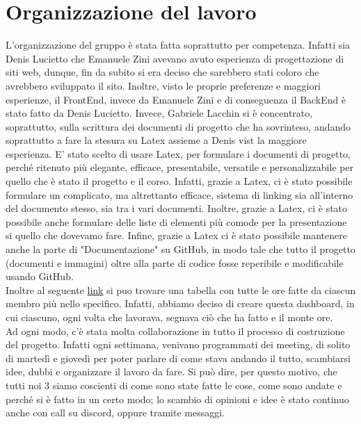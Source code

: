 \documentclass{article}
\begin{document}

\pagebreak

\tableofcontents
\pagebreak

\section{Organizzazione del lavoro}

L'organizzazione del gruppo è stata fatta soprattutto per competenza. Infatti sia Denis Lucietto che Emanuele Zini avevano avuto esperienza di progettazione di siti web, dunque, fin da subito si era deciso che sarebbero stati coloro che avrebbero sviluppato il sito. Inoltre, visto le proprie preferenze e maggiori esperienze, il FrontEnd, invece da Emanuele Zini e di conseguenza il BackEnd è stato fatto da Denis Lucietto. Invece, Gabriele Lacchin si è concentrato, soprattutto, sulla scrittura dei documenti di progetto che ha sovrinteso, andando soprattutto a fare la stesura su Latex assieme a Denis vist la maggiore esperienza. E' stato scelto di usare Latex, per formulare i documenti di progetto, perché ritenuto più elegante, efficace, presentabile, versatile e personalizzabile per quello che è stato il progetto e il corso. Infatti, grazie a Latex, ci è stato possibile formulare un complicato, ma altrettanto efficace, sistema di linking sia all'interno del documento stesso, sia tra i vari documenti. Inoltre, grazie a Latex, ci è stato possibile anche formulare delle liste di elementi più comode per la presentazione si quello che dovevamo fare. Infine, grazie a Latex ci è stato possibile mantenere anche la parte di "Documentazione" su GitHub, in modo tale che tutto il progetto (documenti e immagini) oltre alla parte di codice fosse reperibile e modificabile usando GitHub. \\
Inoltre al seguente \href{https://www.notion.so/00afd2533fec4cae9120d119bfb7c9a1?v=332b02dda53744719f961bed09df9116}{link} si puo trovare una tabella con tutte le ore fatte da ciascun membro più nello specifico. Infatti, abbiamo deciso di creare questa dashboard, in cui ciascuno, ogni volta che lavorava, segnava ciò che ha fatto e il monte ore.\\
Ad ogni modo, c'è stata molta collaborazione in tutto il processo di costruzione del progetto. Infatti ogni settimana, venivano programmati dei meeting, di solito di martedì e giovedì per poter parlare di come stava andando il tutto, scambiarsi idee, dubbi e organizzare il lavoro da fare. Si può dire, per questo motivo, che tutti noi 3 siamo coscienti di come sono state fatte le cose, come sono andate e perché si è fatto in un certo modo; lo scambio di opinioni e idee è stato continuo anche con call su discord, oppure tramite messaggi.
\newpage
\end{document}
